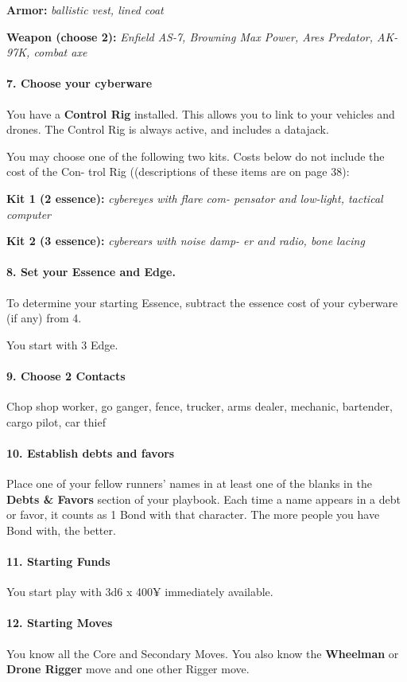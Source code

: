 \begin{multicols}{3}
\textbf{Armor:} \textit{ballistic vest, lined coat}

\textbf{Weapon (choose 2):} \textit{Enfield AS-7, Browning
Max Power, Ares Predator, AK-97K, combat
axe}


\paragraph{7.  Choose your cyberware}

You have a \textbf{Control Rig} installed. This allows you
to link to your vehicles and drones. The Control
Rig is always active, and includes a datajack.

You may choose one of the following two kits.
Costs below do not include the cost of the Con-
trol Rig ((descriptions of these items are on page
38):

\textbf{Kit 1 (2 essence):} \textit{cybereyes with flare com-
pensator and low-light, tactical computer}

\textbf{Kit 2 (3 essence):} \textit{cyberears with noise damp-
er and radio, bone lacing}


\paragraph{8.  Set your Essence and Edge.}

To determine your starting Essence, subtract the
essence cost of your cyberware (if any) from 4.

You start with 3 Edge.

\paragraph{9.  Choose 2 Contacts}

Chop shop worker, go ganger, fence, trucker,
arms dealer, mechanic, bartender, cargo pilot,
car thief


\paragraph{10.  Establish debts and favors}

Place one of your fellow runners’ names in at
least one of the blanks in the \textbf{Debts \& Favors}
section of your playbook. Each time a name
appears in a debt or favor, it counts as 1 Bond
with that character. The more people you have
Bond with, the better.

\paragraph{11.  Starting Funds}

You start play with 3d6 x 400¥ immediately
available.

\paragraph{12.  Starting Moves}

You know all the Core and Secondary Moves.
You also know the \textbf{Wheelman} or
\textbf{Drone Rigger} move and one other Rigger move.

\end{multicols}

